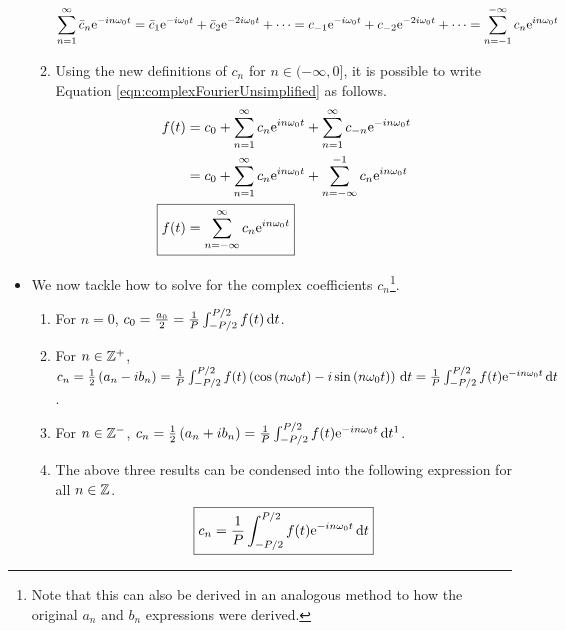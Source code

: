 \documentclass{article}
\begin{document}
\begin{itemize}
\begin{enumerate}
        \begin{equation*}
            \sum_{n=1}^\infty \bar{c}_n\e[-in\omega_0t]
            = \bar{c}_1\e[-i\omega_0t]+\bar{c}_2\e[-2i\omega_0t]+\cdots
            = c_{-1}\e[-i\omega_0t]+c_{-2}\e[-2i\omega_0t]+\cdots
            = \sum_{n=-1}^{-\infty} c_n\e[in\omega_0t]
        \end{equation*}
        \item Using the new definitions of $c_n$ for $n\in(-\infty,0]$, it is possible to write Equation \ref{eqn:complexFourierUnsimplified} as follows.
        \begin{align*}
            f(t) &= c_0+\sum_{n=1}^\infty c_n\e[in\omega_0t] + \sum_{n=1}^\infty c_{-n}\e[-in\omega_0t]\\
            &= c_0+\sum_{n=1}^\infty c_n\e[in\omega_0t] + \sum_{n=-\infty}^{-1} c_n\e[in\omega_0t]\\
            \Aboxed{f(t) &= \sum_{n=-\infty}^\infty c_n\e[in\omega_0t]}
        \end{align*}
    \end{enumerate}
    \pagebreak
    \item We now tackle how to solve for the complex coefficients $c_n$\footnote{Note that this can also be derived in an analogous method to how the original $a_n$ and $b_n$ expressions were derived.}.
    \begin{enumerate}
        \item For $n=0$, $
            c_0
            = \frac{a_0}{2}
            = \frac{1}{P}\int_{-P/2}^{P/2} f(t)\D{t}
        $.
        \item For $n\in\Z^+$, $
            c_n
            = \frac{1}{2}\left( a_n-ib_n \right)
            = \frac{1}{P}\int_{-P/2}^{P/2}f(t)\left( \cos\left( n\omega_0t \right)-i\sin\left( n\omega_0t \right) \right)\D{t}
            = \frac{1}{P}\int_{-P/2}^{P/2}f(t)\e[-in\omega_0t]\D{t}
        $.
        \item For $n\in\Z^-$, $
            c_n =
            \frac{1}{2}\left( a_n+ib_n \right)
            = \frac{1}{P}\int_{-P/2}^{P/2}f(t)\e[-in\omega_0t]\D{t}\footnotemark
        $.
        \item The above three results can be condensed into the following expression for all $n\in\Z$.
        \begin{equation*}
            \boxed{c_n = \frac{1}{P}\int_{-P/2}^{P/2} f(t)\e[-in\omega_0t]\D{t}}
        \end{equation*}
    \end{enumerate}
\end{itemize}
\end{document}
